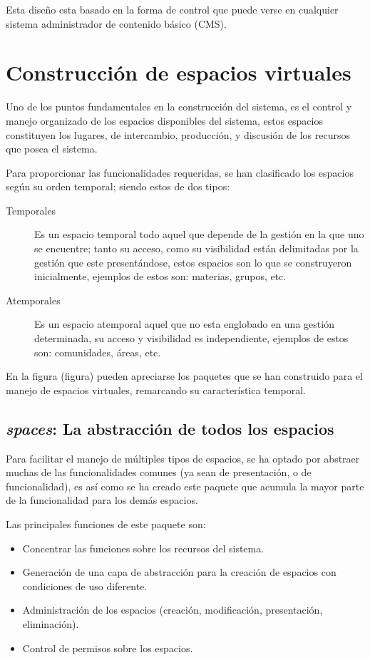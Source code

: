 Esta diseño esta basado en la forma de control que puede verse en cualquier
sistema administrador de contenido básico (CMS).

\section{Construcción de espacios virtuales}
Uno de los puntos fundamentales en la construcción del sistema, es el control y
manejo organizado de los espacios disponibles del sistema, estos espacios
constituyen los lugares, de intercambio, producción, y discusión de los
recursos que posea el sistema.

Para proporcionar las funcionalidades requeridas, se han clasificado los
espacios según su orden temporal; siendo estos de dos tipos:

\begin{description}
\item [Temporales] Es un espacio temporal todo aquel que depende de la gestión
en la que uno se encuentre; tanto su acceso, como su visibilidad están
delimitadas por la gestión que este presentándose, estos espacios son lo que se
construyeron inicialmente, ejemplos de estos son: materias, grupos, etc.
\item [Atemporales] Es un espacio atemporal aquel que no esta englobado en una
gestión determinada, su acceso y visibilidad es independiente, ejemplos de
estos son: comunidades, áreas, etc.
\end{description}

En la figura (figura) pueden apreciarse los paquetes que se han construido para
el manejo de espacios virtuales, remarcando su característica temporal.

\subsection{\emph{spaces}: La abstracción de todos los espacios}
Para facilitar el manejo de múltiples tipos de espacios, se ha optado por
abstraer muchas de las funcionalidades comunes (ya sean de presentación, o de
funcionalidad), es así como se ha creado este paquete que acumula la mayor parte
de la funcionalidad para los demás espacios.

Las principales funciones de este paquete son:

\begin{itemize}
\item Concentrar las funciones sobre los recursos del sistema.
\item Generación de una capa de abstracción para la creación de espacios con
condiciones de uso diferente.
\item Administración de los espacios (creación, modificación, presentación,
eliminación).
\item Control de permisos sobre los espacios.
\end{itemize}

